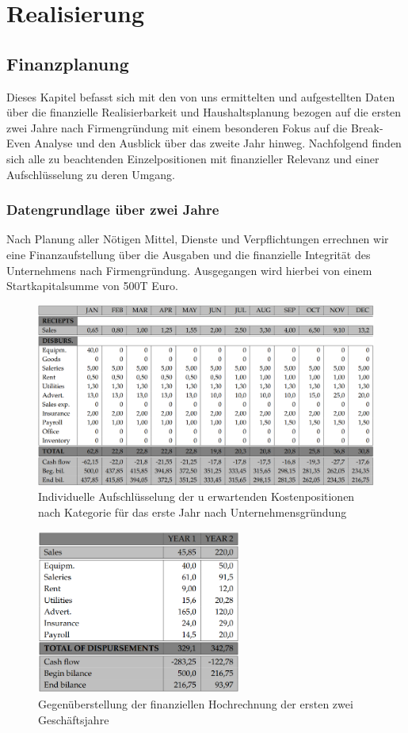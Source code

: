 \documentclass[11pt,a4paper]{report}
\begin{document}
\chapter{Realisierung}
\section{Finanzplanung}
Dieses Kapitel befasst sich mit den von uns ermittelten und aufgestellten Daten über die finanzielle Realisierbarkeit und Haushaltsplanung bezogen auf die ersten zwei Jahre nach Firmengründung mit einem besonderen Fokus auf die Break-Even Analyse und den Ausblick über das zweite Jahr hinweg. Nachfolgend finden sich alle zu beachtenden Einzelpositionen mit finanzieller Relevanz und einer Aufschlüsselung zu deren Umgang.
\subsection{Datengrundlage über zwei Jahre}
Nach Planung aller Nötigen Mittel, Dienste und Verpflichtungen errechnen wir eine Finanzaufstellung über die Ausgaben und die finanzielle Integrität des Unternehmens nach Firmengründung. Ausgegangen wird hierbei von einem Startkapitalsumme von 500T Euro.
\begin{figure}[htb]
    \includegraphics[width=1\textwidth]{daten1.png}
    \caption{Individuelle Aufschlüsselung der u erwartenden Kostenpositionen nach Kategorie für das erste Jahr nach Unternehmensgründung}
    \label{3_2}
\end{figure}

\begin{figure}[htb]
    \includegraphics[width=0.6\textwidth]{daten2.png}
    \caption{Gegenüberstellung der finanziellen Hochrechnung der ersten zwei Geschäftsjahre}
    \label{3_2}
\end{figure}
\end{document}
